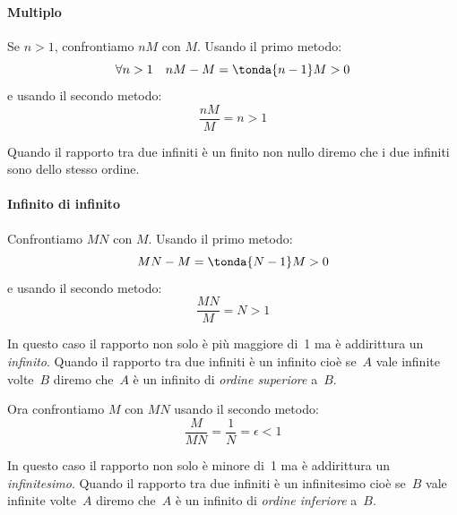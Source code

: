 \paragraph{Multiplo}
Se \(n>1\), confrontiamo \(nM\) con \(M\). 
Usando il primo metodo:
\[\forall n>1 \quad nM-M = \tonda{n-1}M > 0\]
e usando il secondo metodo: 
\[\frac{nM}{M} = n > 1\]

\begin{osservazione}
Quando il rapporto tra due infiniti è un finito non nullo 
diremo che i due infiniti sono dello stesso ordine.
\end{osservazione}

\paragraph{Infinito di infinito}
Confrontiamo \(MN\) con \(M\). 
Usando il primo metodo:
\[MN-M = \tonda{N-1}M > 0\]
e usando il secondo metodo: 
\[\frac{MN}{M} = N > 1\]

\begin{osservazione}
In questo caso il rapporto non solo è più maggiore di~1 ma è addirittura un 
\emph{infinito}. 
Quando il rapporto tra due infiniti è un infinito cioè 
se~\(A\) vale infinite volte~\(B\) diremo che~\(A\) è un infinito di 
\emph{ordine superiore} a~\(B\).
\end{osservazione}

\vspace{1em}
Ora confrontiamo \(M\) con \(MN\) usando il secondo metodo: 
\[\frac{M}{MN} = \frac{1}{N} = \epsilon < 1\]

\begin{osservazione}
In questo caso il rapporto non solo è minore di~1 ma è addirittura un 
\emph{infinitesimo}. 
Quando il rapporto tra due infiniti è un infinitesimo cioè 
se~\(B\) vale infinite volte~\(A\) diremo che~\(A\) è un infinito di 
\emph{ordine inferiore} a~\(B\).
\end{osservazione}

